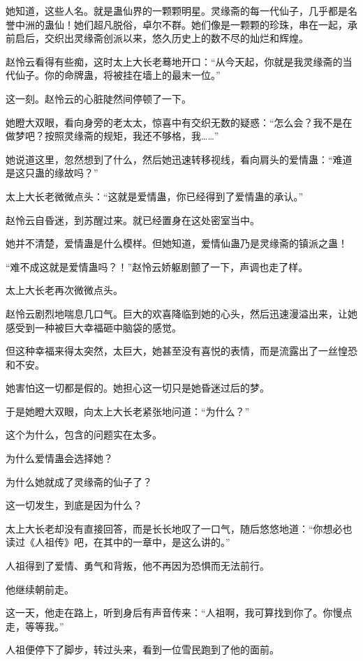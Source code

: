 \begin{this_body}
她知道，这些人名。就是蛊仙界的一颗颗明星。灵缘斋的每一代仙子，几乎都是名誉中洲的蛊仙！她们超凡脱俗，卓尔不群。她们像是一颗颗的珍珠，串在一起，承前启后，交织出灵缘斋创派以来，悠久历史上的数不尽的灿烂和辉煌。

赵怜云看得有些痴，这时太上大长老蓦地开口：“从今天起，你就是我灵缘斋的当代仙子。你的命牌蛊，将被挂在墙上的最末一位。”

这一刻。赵怜云的心脏陡然间停顿了一下。

她瞪大双眼，看向身旁的老太太，惊喜中有交织无数的疑惑：“怎么会？我不是在做梦吧？按照灵缘斋的规矩，我还不够格，我……”

她说道这里，忽然想到了什么，然后她迅速转移视线，看向肩头的爱情蛊：“难道是这只蛊的缘故吗？”

太上大长老微微点头：“这就是爱情蛊，你已经得到了爱情蛊的承认。”

赵怜云自昏迷，到苏醒过来。就已经置身在这处密室当中。

她并不清楚，爱情蛊是什么模样。但她知道，爱情仙蛊乃是灵缘斋的镇派之蛊！

“难不成这就是爱情蛊吗？！”赵怜云娇躯剧颤了一下，声调也走了样。

太上大长老再次微微点头。

赵怜云剧烈地喘息几口气。巨大的欢喜降临到她的心头，然后迅速漫溢出来，让她感受到一种被巨大幸福砸中脑袋的感觉。

但这种幸福来得太突然，太巨大，她甚至没有喜悦的表情，而是流露出了一丝惶恐和不安。

她害怕这一切都是假的。她担心这一切只是她昏迷过后的梦。

于是她瞪大双眼，向太上大长老紧张地问道：“为什么？”

这个为什么，包含的问题实在太多。

为什么爱情蛊会选择她？

为什么她就成了灵缘斋的仙子了？

这一切发生，到底是因为什么？

太上大长老却没有直接回答，而是长长地叹了一口气，随后悠悠地道：“你想必也读过《人祖传》吧，在其中的一章中，是这么讲的。”

人祖得到了爱情、勇气和背叛，他不再因为恐惧而无法前行。

他继续朝前走。

这一天，他走在路上，听到身后有声音传来：“人祖啊，我可算找到你了。你慢点走，等等我。”

人祖便停下了脚步，转过头来，看到一位雪民跑到了他的面前。


\end{this_body}
